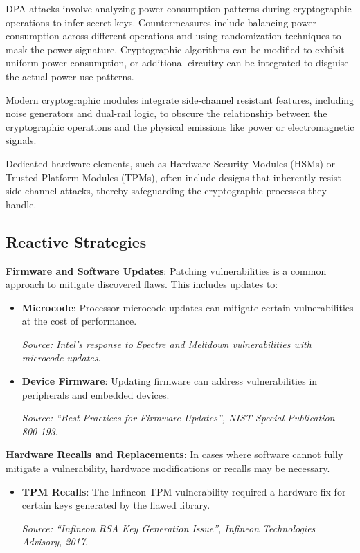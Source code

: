   DPA attacks involve analyzing power consumption patterns during cryptographic operations to infer secret keys. Countermeasures include balancing power consumption across different operations and using randomization techniques to mask the power signature. Cryptographic algorithms can be modified to exhibit uniform power consumption, or additional circuitry can be integrated to disguise the actual power use patterns.

  Modern cryptographic modules integrate side-channel resistant features, including noise generators and dual-rail logic, to obscure the relationship between the cryptographic operations and the physical emissions like power or electromagnetic signals.

  Dedicated hardware elements, such as Hardware Security Modules (HSMs) or Trusted Platform Modules (TPMs), often include designs that inherently resist side-channel attacks, thereby safeguarding the cryptographic processes they handle.
  
\hypertarget{reactive-strategies}{%
\subsection{Reactive Strategies}\label{reactive-strategies}}

\textbf{Firmware and Software Updates}: Patching vulnerabilities is a
common approach to mitigate discovered flaws. This includes updates to:

\begin{itemize}
\item
  \textbf{Microcode}: Processor microcode updates can mitigate certain
  vulnerabilities at the cost of performance.

  \emph{Source: Intel's response to Spectre and Meltdown vulnerabilities
  with microcode updates}.
\item
  \textbf{Device Firmware}: Updating firmware can address
  vulnerabilities in peripherals and embedded devices.

  \emph{Source: ``Best Practices for Firmware Updates'', NIST Special
  Publication 800-193}.
\end{itemize}

\textbf{Hardware Recalls and Replacements}: In cases where software
cannot fully mitigate a vulnerability, hardware modifications or recalls
may be necessary.

\begin{itemize}
\item
  \textbf{TPM Recalls}: The Infineon TPM vulnerability required a
  hardware fix for certain keys generated by the flawed library.

  \emph{Source: ``Infineon RSA Key Generation Issue'', Infineon
  Technologies Advisory, 2017}.
\end{itemize}


